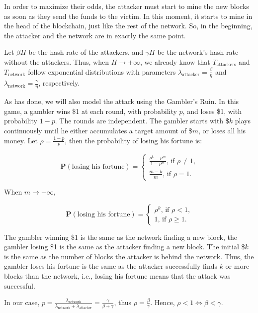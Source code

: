 In order to maximize their odds, the attacker must start to mine the new blocks as soon as they send the funds to the victim. In this moment, it starts to mine in the head of the blockchain, just like the rest of the network. So, in the beginning, the attacker and the network are in exactly the same point.

Let $\beta H$ be the hash rate of the attackers, and $\gamma H$ be the network's hash rate without the attackers. Thus, when $H \rightarrow +\infty$, we already know that $T_{\text{attackers}}$ and $T_{\text{network}}$ follow exponential distributions with parameters $\lambda_{\text{attacker}} = \frac{\beta}{\eta}$ and $\lambda_{\text{network}} = \frac{\gamma}{\eta}$, respectively.

As \cite{nakamoto2008bitcoin} has done, we will also model the attack using the Gambler's Ruin. In this game, a gambler wins \$1 at each round, with probability $p$, and loses \$1, with probability $1-p$. The rounds are independent. The gambler starts with \$$k$ plays continuously until he either accumulates a target amount of \$$m$, or loses all his money. Let $\rho = \frac{1-p}{p}$, then the probability of losing his fortune is:

$$
\mathbf{P}(\text{losing his fortune}) =
\begin{cases}
	\frac{\rho^k - \rho^m}{1-\rho^m} \text{, if $\rho \ne 1$,} \\
	\frac{m-k}{m} \text{, if $\rho = 1$.}
\end{cases}
$$

When $m \rightarrow +\infty$,

$$
\mathbf{P}(\text{losing his fortune}) =
\begin{cases}
	\rho^k \text{, if $\rho < 1$,} \\
	1 \text{, if $\rho \geq 1$.}
\end{cases}
$$


The gambler winning \$1 is the same as the network finding a new block, the gambler losing \$1 is the same as the attacker finding a new block. The initial \$$k$ is the same as the number of blocks the attacker is behind the network. Thus, the gambler loses his fortune is the same as the attacker successfully finds $k$ or more blocks than the network, i.e., losing his fortune means that the attack was successful.

In our case, $p = \frac{\lambda_{\text{network}}}{\lambda_{\text{network}} + \lambda_{\text{attacker}}} = \frac{\gamma}{\beta + \gamma}$, thus $\rho = \frac{\beta}{\gamma}$. Hence, $\rho < 1 \Leftrightarrow \beta < \gamma$.

